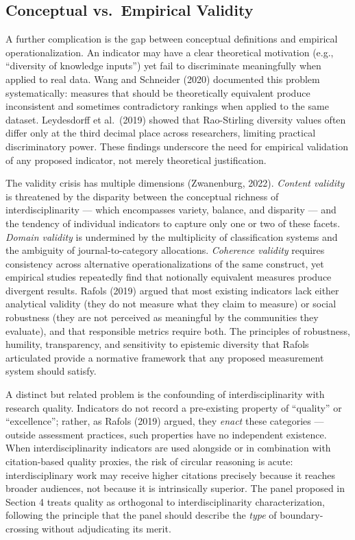 \documentclass[
]{article}
\begin{document}
\hypertarget{conceptual-vs.-empirical-validity}{%
\subsection{Conceptual vs.~Empirical
Validity}\label{conceptual-vs.-empirical-validity}}

A further complication is the gap between conceptual definitions and
empirical operationalization. An indicator may have a clear theoretical
motivation (e.g., ``diversity of knowledge inputs'') yet fail to
discriminate meaningfully when applied to real data. Wang and Schneider
(2020) documented this problem systematically: measures that should be
theoretically equivalent produce inconsistent and sometimes
contradictory rankings when applied to the same dataset. Leydesdorff et
al.~(2019) showed that Rao-Stirling diversity values often differ only
at the third decimal place across researchers, limiting practical
discriminatory power. These findings underscore the need for empirical
validation of any proposed indicator, not merely theoretical
justification.

The validity crisis has multiple dimensions (Zwanenburg, 2022).
\emph{Content validity} is threatened by the disparity between the
conceptual richness of interdisciplinarity --- which encompasses
variety, balance, and disparity --- and the tendency of individual
indicators to capture only one or two of these facets. \emph{Domain
validity} is undermined by the multiplicity of classification systems
and the ambiguity of journal-to-category allocations. \emph{Coherence
validity} requires consistency across alternative operationalizations of
the same construct, yet empirical studies repeatedly find that
notionally equivalent measures produce divergent results. Rafols (2019)
argued that most existing indicators lack either analytical validity
(they do not measure what they claim to measure) or social robustness
(they are not perceived as meaningful by the communities they evaluate),
and that responsible metrics require both. The principles of robustness,
humility, transparency, and sensitivity to epistemic diversity that
Rafols articulated provide a normative framework that any proposed
measurement system should satisfy.

A distinct but related problem is the confounding of interdisciplinarity
with research quality. Indicators do not record a pre-existing property
of ``quality'' or ``excellence''; rather, as Rafols (2019) argued, they
\emph{enact} these categories --- outside assessment practices, such
properties have no independent existence. When interdisciplinarity
indicators are used alongside or in combination with citation-based
quality proxies, the risk of circular reasoning is acute:
interdisciplinary work may receive higher citations precisely because it
reaches broader audiences, not because it is intrinsically superior. The
panel proposed in Section 4 treats quality as orthogonal to
interdisciplinarity characterization, following the principle that the
panel should describe the \emph{type} of boundary-crossing without
adjudicating its merit.
\end{document}
